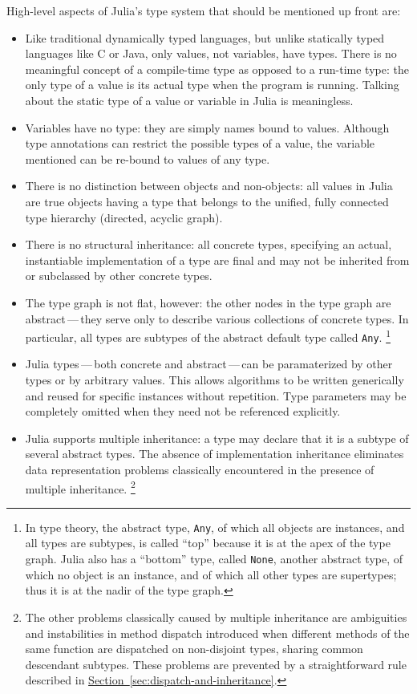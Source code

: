 \documentclass{article}
\newcommand{\Section}[1]{\hyperref[sec:#1]{Section~\ref*{sec:#1}}}
\begin{document}
High-level aspects of Julia's type system that should be mentioned up front are:
\begin{itemize}

\item Like traditional dynamically typed languages, but unlike statically typed languages like C or Java, only values, not variables, have types.
There is no meaningful concept of a compile-time type as opposed to a run-time type:
the only type of a value is its actual type when the program is running.
Talking about the static type of a value or variable in Julia is meaningless.

\item Variables have no type: they are simply names bound to values.
Although type annotations can restrict the possible types of a value, the variable mentioned can be re-bound to values of any type.

\item There is no distinction between objects and non-objects:
all values in Julia are true objects having a type that belongs to the unified, fully connected type hierarchy (directed, acyclic graph).

\item There is no structural inheritance:
all concrete types, specifying an actual, instantiable implementation of a type are final and may not be inherited from or subclassed by other concrete types.

\item The type graph is not flat, however:
the other nodes in the type graph are abstract\,---\,they serve only to describe various collections of concrete types.
In particular, all types are subtypes of the abstract default type called \verb|Any|.%
\footnote{In type theory, the abstract type, \texttt{Any}, of which all objects are instances, and all types are subtypes, is called ``top'' because it is at the apex of the type graph.
Julia also has a ``bottom'' type, called \texttt{None}, another abstract type, of which no object is an instance, and of which all other types are supertypes;
thus it is at the nadir of the type graph.}

\item Julia types\,---\,both concrete and abstract\,---\,can be paramaterized by other types or by arbitrary values.
This allows algorithms to be written generically and reused for specific instances without repetition.
Type parameters may be completely omitted when they need not be referenced explicitly.

\item Julia supports multiple inheritance:
a type may declare that it is a subtype of several abstract types.
The absence of implementation inheritance eliminates data representation problems classically encountered in the presence of multiple inheritance.%
\footnote{The other problems classically caused by multiple inheritance are ambiguities and instabilities in method dispatch introduced when different methods of the same function are dispatched on non-disjoint types, sharing common descendant subtypes.
These problems are prevented by a straightforward rule described in \Section{dispatch-and-inheritance}.}


\end{itemize}
\end{document}

